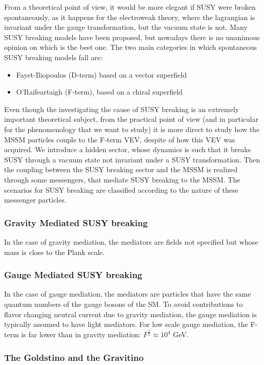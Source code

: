From a theoretical point of view, it would be more elegant if SUSY were broken spontaneously, as it happens for the electroweak theory, where the lagrangian is invariant under the gauge transformation, but the vacuum state is not. Many SUSY breaking models have been proposed, but nowadays there is no unanimous opinion on which is the best one. The two main categories in which spontaneous SUSY breaking models fall are:
\begin{itemize}
\item Fayet-Iliopoulos (D-term) based on a vector superfield
\item O'Raifeartaigh (F-term), based on a chiral superfield
\end{itemize}
Even though the investigating the cause of SUSY breaking is an extremely important theoretical subject, from the practical point of view (and in particular for the phenomenology that we want to study) it is more direct to study how the MSSM particles couple to the F-term VEV, despite of how this VEV was acquired. We introduce a hidden sector, whose dynamics is such that it breaks SUSY through a vacuum state not invariant under a SUSY transformation. Then the coupling between the SUSY breaking sector and the MSSM is realized through some messengers, that mediate SUSY breaking to the MSSM. The scenarios for SUSY breaking are classified according to the nature of these messenger particles.

\subsubsection{Gravity Mediated SUSY breaking}

In the case of gravity mediation, the mediators are fields not specified but whose mass is close to the Plank scale. 

\subsubsection{Gauge Mediated SUSY breaking}
\label{sec:gaugemediation}

In the case of gauge mediation, the mediators are particles that have the same quantum numbers of the gauge bosons of the SM. To avoid contributions to flavor changing neutral current due to gravity mediation, the gauge mediation is typically assumed to have light mediators. For low scale gauge mediation, the F-term is far lower than in gravity mediation: $F^\frac{1}{2} \approx 10^4$ GeV. 

\subsubsection{The Goldstino and the Gravitino}

